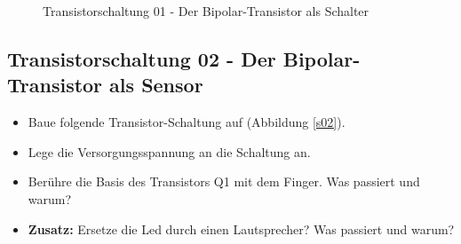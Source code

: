 \begin{figure}[H]
	\centering
	\caption{Transistorschaltung 01 - Der Bipolar-Transistor als Schalter}
	\label{s01}
\end{figure}


\subsection[Der Bipolar-Transistor als Sensor]{Transistorschaltung 02 - Der Bipolar-Transistor als Sensor}

\begin{itemize}
\itemsep1pt\parskip0pt
\item Baue folgende Transistor-Schaltung auf (Abbildung \ref{s02}). 
\item Lege die Versorgungsspannung an die Schaltung an.
\item Berühre die Basis des Transistors Q1 mit dem Finger. Was passiert und warum?
\item \textbf{Zusatz:} Ersetze die Led durch einen Lautsprecher? Was passiert und warum?
\end{itemize}

